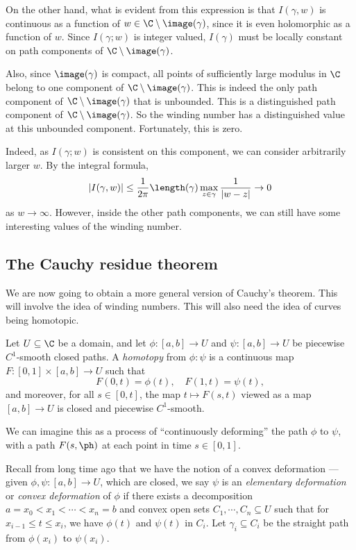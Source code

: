 \documentclass[a4paper]{article}
\begin{document}
On the other hand, what is evident from this expression is that $I(\gamma, w)$ is continuous as a function of $w \in \C \setminus \image(\gamma)$, since it is even holomorphic as a function of $w$. Since $I(\gamma; w)$ is integer valued, $I(\gamma)$ must be locally constant on path components of $\C \setminus \image(\gamma)$.

Also, since $\image(\gamma)$ is compact, all points of sufficiently large modulus in $\C$ belong to one component of $\C \setminus \image(\gamma)$. This is indeed the only path component of $\C\setminus \image(\gamma)$ that is unbounded. This is a distinguished path component of $\C \setminus \image(\gamma)$. So the winding number has a distinguished value at this unbounded component. Fortunately, this is zero.

Indeed, as $I(\gamma; w)$ is consistent on this component, we can consider arbitrarily larger $w$. By the integral formula,
\[
  |I(\gamma, w)| \leq \frac{1}{2\pi} \length(\gamma) \max_{z \in \gamma} \frac{1}{|w - z|} \to 0
\]
as $w \to \infty$. However, inside the other path components, we can still have some interesting values of the winding number.

\subsection{The Cauchy residue theorem}
We are now going to obtain a more general version of Cauchy's theorem. This will involve the idea of winding numbers. This will also need the idea of curves being homotopic.
\begin{defi}
  Let $U \subseteq \C$ be a domain, and let $\phi: [a, b] \to U$ and $\psi: [a, b] \to U$ be piecewise $C^1$-smooth closed paths. A \emph{homotopy} from $\phi: \psi$ is a continuous map $F: [0, 1] \times [a, b] \to U$ such that
  \[
    F(0, t) = \phi(t),\quad F(1, t) = \psi(t),
  \]
  and moreover, for all $s \in [0, t]$, the map $t \mapsto F(s, t)$ viewed as a map $[a, b] \to U$ is closed and piecewise $C^1$-smooth.
\end{defi}
We can imagine this as a process of ``continuously deforming'' the path $\phi$ to $\psi$, with a path $F(s, \ph)$ at each point in time $s \in [0, 1]$.

Recall from long time ago that we have the notion of a convex deformation --- given $\phi, \psi: [a, b] \to U$, which are closed, we say $\psi$ is an \emph{elementary deformation} or \emph{convex deformation} of $\phi$ if there exists a decomposition $a = x_0 < x_1 < \cdots < x_n = b$ and convex open sets $C_1, \cdots, C_n \subseteq U$ such that for $x_{i - 1} \leq t \leq x_i$, we have $\phi(t)$ and $\psi(t)$ in $C_i$. Let $\gamma_i \subseteq C_i$ be the straight path from $\phi(x_i)$ to $\psi(x_i)$.
\end{document}
